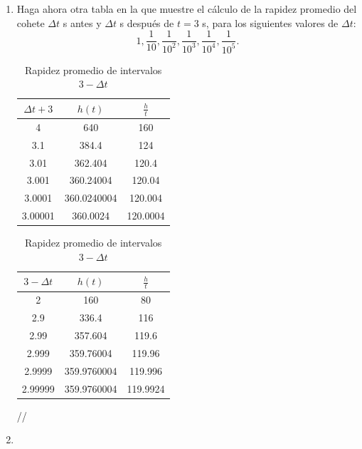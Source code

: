 \documentclass[12pt]{article}
\begin{document}
\begin{enumerate}
\item Haga ahora otra tabla en la que muestre el cálculo de la rapidez promedio del cohete $\Delta t$ s antes y $\Delta t$ s después de $t = 3$ s, para los siguientes valores de $\Delta t$:\[1,\frac{1}{10},\frac{1}{10^2},\frac{1}{10^3},\frac{1}{10^4},\frac{1}{10^5}.\]
\begin{table}[h]
\begin{center}
\begin{minipage}{0.45\linewidth}
\centering
\begin{tabular}{| c | c | c |}\hline %
  $\Delta t+3$  & $h(t)$  &$\frac{h}{t}$\\ \hline
4&640&160 \\
3.1&384.4&124\\
3.01&362.404&120.4\\
3.001&360.24004&120.04\\
3.0001&360.0240004&120.004\\
3.00001&360.0024&120.0004 \\ \hline
\end{tabular}
\caption{Rapidez promedio de intervalos $\Delta t + 3$}
\label{tab:rapprom+3}
\end{minipage}
\hspace{0.05\linewidth} 
\begin{minipage}{0.45\linewidth}
  \centering
  \begin{tabular}{| c | c | c |}\hline %
  $3 - \Delta t$  & $h(t)$  &$\frac{h}{t}$\\ \hline
2&160&80 \\
2.9&336.4&116\\
2.99&357.604&119.6\\
2.999&359.76004&119.96\\
2.9999&359.9760004&119.996\\
2.99999&359.9760004&119.9924\\ \hline
\end{tabular}
\caption{Rapidez promedio de intervalos $3 - \Delta t$}
\label{tab:rapprom-3}
\end{minipage}
\end{center}
\end{table}
//%
\item 


\end{enumerate}
\end{document}
